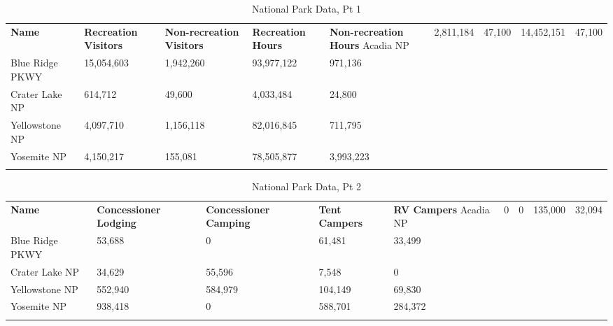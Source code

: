 \begin{table}[H]
	{\small
		\begin{longtable}{L{1.25in}L{0.70in}L{0.60in}L{0.70in}L{0.60in}} %
		\textbf{Name} & \textbf{Recreation Visitors} & \textbf{Non-recreation Visitors} & \textbf{Recreation Hours} & \textbf{Non-recreation Hours} \endhead
		\hline
		Acadia NP       & 2,811,184  & 47,100    & 14,452,151 & 47,100    \\
		Blue Ridge PKWY & 15,054,603 & 1,942,260 & 93,977,122 & 971,136   \\
		Crater Lake NP  & 614,712    & 49,600    & 4,033,484  & 24,800    \\
		Yellowstone NP  & 4,097,710  & 1,156,118 & 82,016,845 & 711,795   \\
		Yosemite NP     & 4,150,217  & 155,081   & 78,505,877 & 3,993,223 \\
		\caption{National Park Data, Pt 1}
		\label{06:tab05}
		\end{longtable}
	}
\end{table}

\begin{table}[H]
	{\small
		\begin{longtable}{L{1.25in}L{0.60in}L{0.60in}L{0.60in}L{0.60in}} %
			\textbf{Name} & \textbf{Concessioner Lodging} & \textbf{Concessioner Camping} & \textbf{Tent Campers} & \textbf{RV Campers} \endhead
			\hline
			Acadia NP       & 0       & 0       & 135,000 & 32,094  \\
			Blue Ridge PKWY & 53,688  & 0       & 61,481  & 33,499  \\
			Crater Lake NP  & 34,629  & 55,596  & 7,548   & 0       \\
			Yellowstone NP  & 552,940 & 584,979 & 104,149 & 69,830  \\
			Yosemite NP     & 938,418 & 0       & 588,701 & 284,372 \\
			\caption{National Park Data, Pt 2}
			\label{06:tab06}
		\end{longtable}
	}
\end{table}

